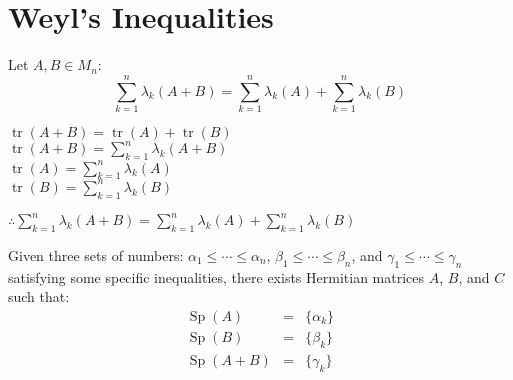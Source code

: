 \documentclass[letterpaper,12pt,fleqn]{article}
\renewcommand{\a}{\alpha}
\renewcommand{\b}{\beta}
\newcommand{\g}{\gamma}
\renewcommand{\l}{\lambda}
\DeclareMathOperator{\tr}{tr}
\DeclareMathOperator{\Sp}{Sp}
\begin{document}
\section*{Weyl's Inequalities}

\begin{theorem}
  Let $A,B\in M_n$:
  \[\sum_{k=1}^n\l_k(A+B)=\sum_{k=1}^n\l_k(A)+\sum_{k=1}^n\l_k(B)\]
\end{theorem}

\begin{theproof}
  $\tr(A+B)=\tr(A)+\tr(B)$ \\
  $\tr(A+B)=\sum_{k=1}^n\l_k(A+B)$ \\
  $\tr(A)=\sum_{k=1}^n\l_k(A)$ \\
  $\tr(B)=\sum_{k=1}^n\l_k(B)$

  $\therefore\sum_{k=1}^n\l_k(A+B)=\sum_{k=1}^n\l_k(A)+\sum_{k=1}^n\l_k(B)$
\end{theproof}

\begin{theorem}
  Given three sets of numbers: $\a_1\le\cdots\le\a_n$, $\b_1\le\cdots\le\b_n$,
  and $\g_1\le\cdots\le\g_n$ satisfying some specific inequalities, there
  exists Hermitian matrices $A$, $B$, and $C$ such that:
  \begin{eqnarray*}
    \Sp(A) &=& \{\a_k\} \\
    \Sp(B) &=& \{\b_k\} \\
    \Sp(A+B) &=& \{\g_k\} \\
  \end{eqnarray*}
\end{theorem}
\end{document}
